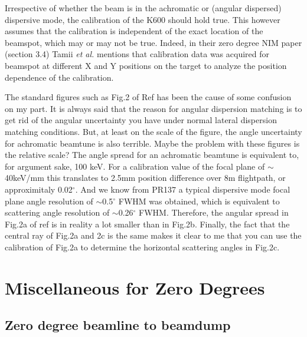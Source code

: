 \documentclass[11pt]{report}
\begin{document}
Irrespective of whether the beam is in the achromatic or (angular dispersed) dispersive mode, 
the calibration of the K600 should hold true.
This however assumes that the calibration is independent of the exact location of the beamspot, which may or
may not be true. Indeed, in their zero degree NIM paper (section 3.4) Tamii {\it et al.}
mentions that calibration data was acquired for beamspot at different X and Y positions on the target 
to analyze the position dependence of the calibration.

The standard figures such as Fig.2 of Ref \cite{Fuj02} has been the cause of some confusion on
my part. It is always said that the reason for angular dispersion matching is
to get rid of the angular uncertainty you have under normal lateral dispersion matching conditions.
But, at least on the scale of the figure, the angle uncertainty for achromatic beamtune
is also terrible.
Maybe the problem with these figures is the relative scale?
The angle spread for an achromatic beamtune is equivalent to, for argument sake, 100 keV. 
For a calibration value of the focal plane of $\sim$ 40keV/mm this translates to 
2.5mm position difference over 8m flightpath, or approximitaly 0.02$^{\circ}$. 
And we know from PR137 a typical dispersive mode 
focal plane angle resolution of $\sim$0.5$^{\circ}$ FWHM was obtained, which
is equivalent to scattering angle resolution of $\sim$0.26$^{\circ}$ FWHM.  
%
Therefore, the angular spread in Fig.2a of ref \cite{Fuj02} is in reality a lot smaller than in 
Fig.2b. 
%
Finally, the fact that the central ray of Fig.2a and 2c is the same
makes it clear to me that you can use the calibration of Fig.2a to determine the 
horizontal scattering angles in Fig.2c.








\section{Miscellaneous for Zero Degrees}

\subsection{Zero degree beamline to beamdump}
\end{document}
